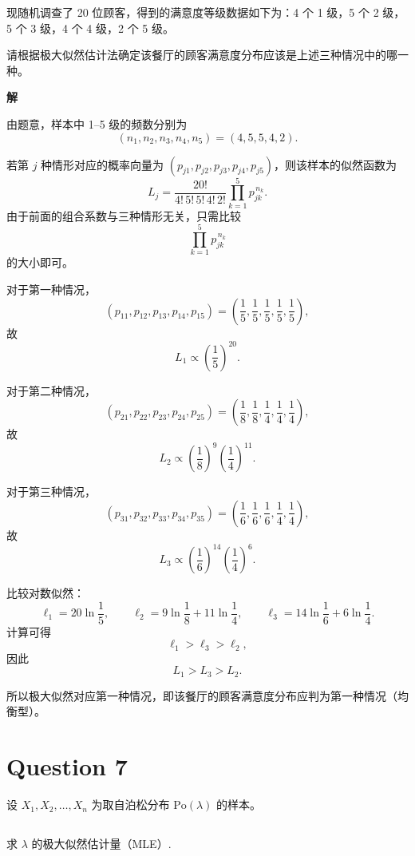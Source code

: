 \documentclass[12pt,a4paper]{article}
\begin{document}
现随机调查了 20 位顾客，得到的满意度等级数据如下为：4 个 1 级，5 个 2 级，5 个 3 级，4 个 4 级，2 个 5 级。

请根据极大似然估计法确定该餐厅的顾客满意度分布应该是上述三种情况中的哪一种。

\begin{answerbox}
\textbf{解}

由题意，样本中 1--5 级的频数分别为
\[
    (n_1,n_2,n_3,n_4,n_5)=(4,5,5,4,2).
\]

若第 $j$ 种情形对应的概率向量为 $(p_{j1},p_{j2},p_{j3},p_{j4},p_{j5})$，则该样本的似然函数为
\[
    L_j=\frac{20!}{4!\,5!\,5!\,4!\,2!}\prod_{k=1}^5 p_{jk}^{\,n_k}.
\]
由于前面的组合系数与三种情形无关，只需比较
\[
    \prod_{k=1}^5 p_{jk}^{\,n_k}
\]
的大小即可。

对于第一种情况，
\[
    (p_{11},p_{12},p_{13},p_{14},p_{15})
    =\left(\frac15,\frac15,\frac15,\frac15,\frac15\right),
\]
故
\[
    L_1 \propto \left(\frac{1}{5}\right)^{20}.
\]

对于第二种情况，
\[
    (p_{21},p_{22},p_{23},p_{24},p_{25})
    =\left(\frac18,\frac18,\frac14,\frac14,\frac14\right),
\]
故
\[
    L_2 \propto \left(\frac{1}{8}\right)^9\left(\frac{1}{4}\right)^{11}.
\]

对于第三种情况，
\[
    (p_{31},p_{32},p_{33},p_{34},p_{35})
    =\left(\frac16,\frac16,\frac16,\frac14,\frac14\right),
\]
故
\[
    L_3 \propto \left(\frac{1}{6}\right)^{14}\left(\frac{1}{4}\right)^6.
\]

比较对数似然：
\[
    \ell_1 = 20\ln\frac15,\qquad
    \ell_2 = 9\ln\frac18 + 11\ln\frac14,\qquad
    \ell_3 = 14\ln\frac16 + 6\ln\frac14.
\]
计算可得
\[
    \ell_1 > \ell_3 > \ell_2,
\]
因此
\[
    L_1 > L_3 > L_2.
\]

所以极大似然对应第一种情况，即该餐厅的顾客满意度分布应判为第一种情况（均衡型）。

\end{answerbox}

\section{Question 7}

设 $X_1,X_2,\ldots,X_n$ 为取自泊松分布 $\mathrm{Po}(\lambda)$ 的样本。

\subsection{}

求 $\lambda$ 的极大似然估计量（MLE）.
\end{document}
